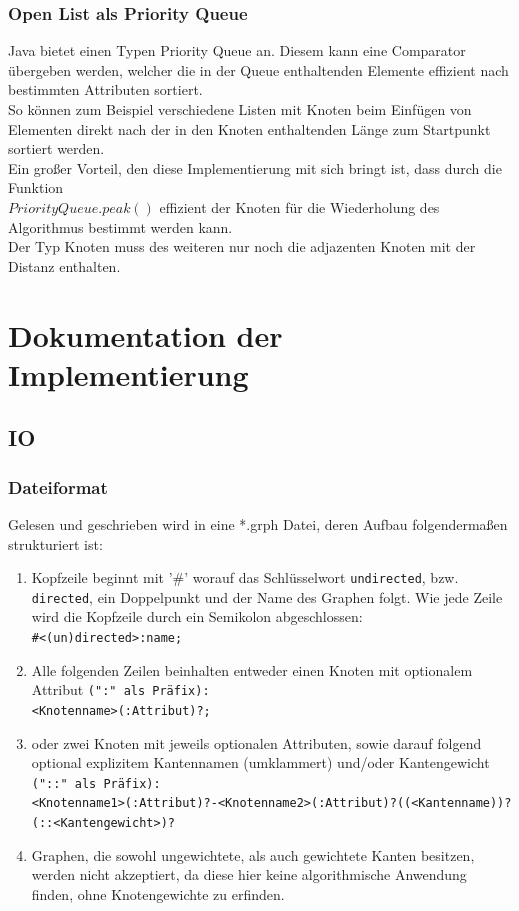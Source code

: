 \documentclass[a4paper]{article}
\begin{document}
\subsubsection{Open List als Priority Queue} \label{priorityQueueSection}

Java bietet einen Typen Priority Queue an. Diesem kann eine Comparator übergeben werden, welcher die in der Queue enthaltenden Elemente effizient nach bestimmten Attributen sortiert.\\
So können zum Beispiel verschiedene Listen mit Knoten beim Einfügen von Elementen direkt nach der in den Knoten enthaltenden Länge zum Startpunkt sortiert werden.\\
Ein großer Vorteil, den diese Implementierung mit sich bringt ist, dass durch die Funktion\\$PriorityQueue.peak()$ effizient der Knoten für die Wiederholung des Algorithmus bestimmt werden kann.\\
Der Typ Knoten muss des weiteren nur noch die adjazenten Knoten mit der Distanz enthalten.\\

\section{Dokumentation der Implementierung}

\subsection{IO}

\subsubsection{Dateiformat}
\label{Dateiformat}
Gelesen und geschrieben wird in eine *.grph Datei, deren Aufbau folgendermaßen strukturiert ist:
\begin{enumerate}
 	\item Kopfzeile beginnt mit '\#' worauf das Schlüsselwort  \verb"undirected", bzw. \verb"directed", ein Doppelpunkt und der Name des Graphen folgt. Wie jede Zeile wird die Kopfzeile durch ein Semikolon abgeschlossen:\\
		\verb|#<(un)directed>:name;|
	\item Alle folgenden Zeilen beinhalten entweder einen Knoten mit optionalem Attribut \verb|(":" als Präfix):| \\
		\verb|<Knotenname>(:Attribut)?;|
	\item oder zwei Knoten mit jeweils optionalen Attributen, sowie darauf folgend optional explizitem Kantennamen (umklammert) und/oder Kantengewicht \verb|("::" als Präfix):|\\
		\verb|<Knotenname1>(:Attribut)?-<Knotenname2>(:Attribut)?((<Kantenname))?(::<Kantengewicht>)?|
    \item Graphen, die sowohl ungewichtete, als auch gewichtete Kanten besitzen, werden nicht akzeptiert, da diese hier keine algorithmische Anwendung finden, ohne Knotengewichte zu erfinden.
\end{enumerate}
\end{document}
